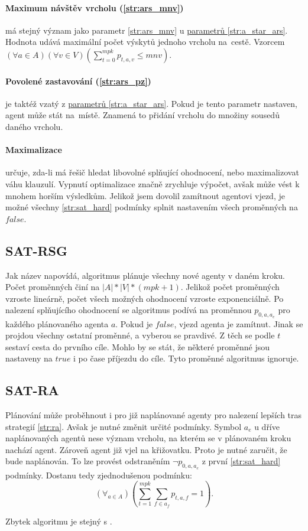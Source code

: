 \paragraph{Maximum návštěv vrcholu (\ref{str:ars_mnv})} má stejný význam jako
parametr \ref{str:ars_mnv} u \hyperref[subsubsec:ars_parametry]{parametrů \ref{str:a_star_ars}}.
Hodnota udává maximální počet výskytů jednoho vrcholu na~cestě.
Vzorcem $(\forall a \in A)(\forall v \in V)\left(\sum_{t=0}^{mpk} p_{t, a, v} \leq mnv\right)$.

\paragraph{Povolené zastavování (\ref{str:ars_pz})}\label{par:sat_povolene_zastavovani} je taktéž vzatý
z \hyperref[subsubsec:ars_parametry]{parametrů \ref{str:a_star_ars}}.
Pokud je tento parametr nastaven, agent může stát na~místě.
Znamená to přidání vrcholu do množiny sousedů daného vrcholu.

\paragraph{Maximalizace} určuje, zda-li má řešič hledat libovolné splňující ohodnocení,
nebo maximalizovat váhu klauzulí.
Vypnutí optimalizace značně zrychluje výpočet, avšak může vést k mnohem horším výsledkům.
Jelikož jsem dovolil zamítnout agentovi vjezd, je možné všechny \ref{str:sat_hard} podmínky splnit
nastavením všech proměnných na $false$.

\subsection{SAT-RSG}\label{subsec:sat_rsg}
Jak název napovídá, algoritmus plánuje všechny nové agenty v daném kroku.
Počet proměnných činí na $|A| * |V| * (mpk + 1)$.
Jelikož počet proměnných vzroste lineárně, počet všech možných ohodnocení vzroste exponenciálně.
Po nalezení splňujícího ohodnocení se algoritmus podívá na proměnnou $p_{0, a, a_e}$ pro každého plánovaného agenta $a$.
Pokud je $false$, vjezd agenta je zamítnut.
Jinak se projdou všechny ostatní proměnné, a vyberou se pravdivé.
Z těch se podle $t$ sestaví cesta do prvního cíle.
Mohlo by se stát, že některé proměnné jsou nastaveny na $true$ i po čase příjezdu do cíle.
Tyto proměnné algoritmus ignoruje.

\subsection{SAT-RA}\label{subsec:sat_ra}

Plánování může proběhnout i pro již naplánované agenty pro nalezení lepších tras strategií \ref{str:ra}.
Avšak je nutné změnit určité podmínky.
Symbol $a_e$ u dříve naplánovaných agentů nese význam vrcholu, na kterém se v plánovaném kroku nachází agent.
Zároveň agent již vjel na křižovatku.
Proto je nutné zaručit, že bude naplánován.
To lze provést odstraněním $\neg p_{0, a, a_e}$ z první \ref{str:sat_hard} podmínky.
Dostanu tedy zjednodušenou podmínku:
\[
	(\forall_{a \in A}) \left(\sum_{t=1}^{mpk} \sum_{f \in a_f} p_{t, a, f} = 1\right).
\]

Zbytek algoritmu je stejný s .
